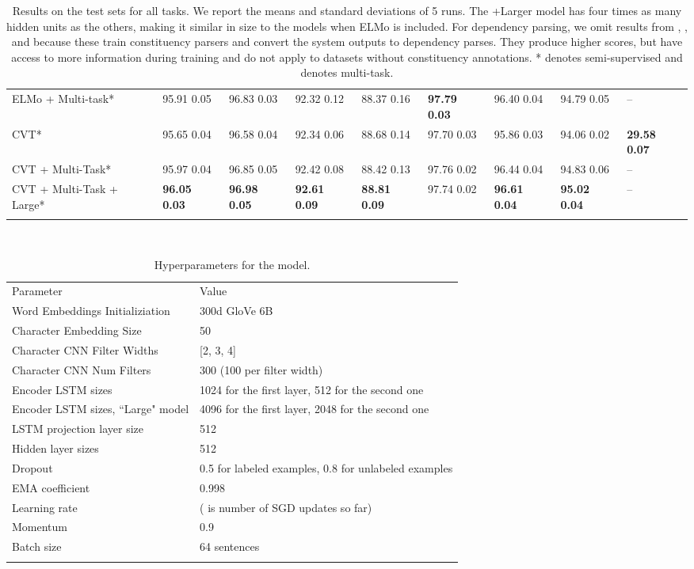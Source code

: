 \documentclass[11pt,a4paper]{article}
\newcommand\Tstrut{\rule{0pt}{2.6ex}}         \newcommand\Bstrut{\rule[-1.0ex]{0pt}{0pt}}   \newcommand{\thinline}{\Xhline{1.0\arrayrulewidth}}
\newcommand{\thickline}{\Xhline{2.5\arrayrulewidth}}
\newcommand{\tsep}	{\Bstrut \\ \thinline}
\newcommand{\ttop}{\thickline}
\newcommand{\tbottom}{\Bstrut \\ \thickline}
\begin{document}
\begin{table*}[b!]
{\begin{tabular}{l | l l l l l | l l | l }
ELMo + Multi-task* & 95.91  0.05 & 96.83  0.03 & 92.32  0.12 & 88.37  0.16 & \textbf{97.79  0.03} & 96.40  0.04 & 94.79  0.05 & -- \\
CVT* & 95.65  0.04 & 96.58  0.04 & 92.34  0.06 & 88.68  0.14 & 97.70  0.03 & 95.86  0.03 & 94.06  0.02 & \textbf{29.58  0.07}   \\
CVT + Multi-Task* & 95.97  0.04 &  96.85  0.05 &  92.42  0.08 & 88.42  0.13 & 97.76  0.02 &  96.44  0.04 &  94.83  0.06 & -- \\
CVT + Multi-Task + Large* & \textbf{96.05  0.03} &  \textbf{96.98  0.05} &  \textbf{92.61  0.09} & \textbf{88.81  0.09} & 97.74  0.02 &  \textbf{96.61  0.04} &  \textbf{95.02  0.04} & -- 
\tbottom
\end{tabular}
}
\vspace{0mm} \\ 
\caption{Results on the test sets for all tasks. We report the means and standard deviations of 5 runs. 
The +Larger model has four times as many hidden units as the others, making it similar in size to the models when ELMo is included. 
For dependency parsing, we omit results from \citet{choe2016parsing}, \citet{kuncoro2017what}, and \citet{Liu2017in} because these train constituency parsers and convert the system outputs to dependency parses. They produce higher scores, but have access to more information during training and do not apply to datasets without constituency annotations. * denotes semi-supervised and  denotes multi-task.}
\vspace{-1mm}
\label{tab:detailed-nlp}
\end{table*}
\addtolength{\tabcolsep}{1pt}


\begin{table*}[t!]
\begin{tabular}{l l}
\ttop
Parameter & Value\Tstrut\tsep
Word Embeddings Initializiation & 300d GloVe 6B \Tstrut\\
Character Embedding Size & 50 \\
Character CNN Filter Widths & [2, 3, 4] \\
Character CNN Num Filters & 300 (100 per filter width) \\
Encoder LSTM sizes & 1024 for the first layer, 512 for the second one \\
Encoder LSTM sizes, ``Large" model & 4096 for the first layer, 2048 for the second one \\
LSTM projection layer size & 512 \\
Hidden layer sizes & 512  \\
Dropout & 0.5 for labeled examples, 0.8 for unlabeled examples\\
EMA coefficient & 0.998\\
Learning rate &  ( is number of SGD updates so far)\\
Momentum & 0.9 \\
Batch size & 64 sentences\tbottom
\end{tabular}
\caption{Hyperparameters for the model.}
\label{tab:hyper}
\end{table*}
\end{document}
